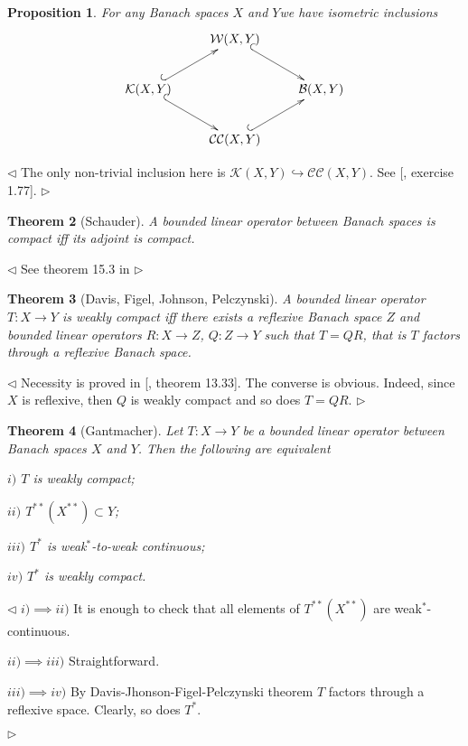 \documentclass[12pt]{article}
\newtheorem{theorem}{Theorem}
\newtheorem{proposition}[theorem]{Proposition}
\newenvironment{proof}{\par $\triangleleft$}{$\triangleright$}
\begin{document}
\begin{proposition} For any Banach spaces $X$ and $Y$we have isometric inclusions
$$
\xymatrix{
                                                   & \mathcal{W}(X,Y) \ar@{^{(}->}[dr]  &                   \\
\mathcal{K}(X,Y) \ar@{^{(}->}[ur] \ar@{^{(}->}[dr] &                                    &  \mathcal{B}(X,Y) \\
                                                   & \mathcal{CC}(X,Y) \ar@{^{(}->}[ur] &                   \\
}
$$
\end{proposition}
\begin{proof} The only non-trivial inclusion here is $\mathcal{K}(X,Y)\hookrightarrow \mathcal{CC}(X,Y)$. See [\cite{FabHabBanSpTh}, exercise 1.77].
\end{proof}

\begin{theorem}[Schauder] A bounded linear operator between Banach spaces is compact iff its adjoint is compact.
\end{theorem}
\begin{proof} See theorem 15.3 in \cite{FabHabBanSpTh}
\end{proof}

\begin{theorem}[Davis, Figel, Johnson, Pelczynski] A bounded linear operator $T:X\to Y$ is weakly compact iff there exists a reflexive Banach space $Z$ and bounded linear operators $R:X\to Z$, $Q:Z\to Y$ such that $T=QR$, that is $T$ factors through a reflexive Banach space.
\end{theorem}
\begin{proof} Necessity is proved in [\cite{FabHabBanSpTh}, theorem 13.33]. The converse is obvious. Indeed, since $X$ is reflexive, then $Q$ is weakly compact and so does $T=QR$.
\end{proof}

\begin{theorem}[Gantmacher] Let $T:X\to Y$ be a bounded linear operator between Banach spaces $X$ and $Y$. Then the following are equivalent

$i)$ $T$ is weakly compact;

$ii)$ $T^{**}(X^{**})\subset Y$;

$iii)$ $T^*$ is weak${}^*$-to-weak continuous;

$iv)$ $T^*$ is weakly compact.
\end{theorem}
\begin{proof} $i)\implies ii)$ It is enough to check that all elements of $T^{**}(X^{**})$ are weak${}^*$-continuous.

$ii)\implies iii)$ Straightforward.

$iii)\implies iv)$ By Davis-Jhonson-Figel-Pelczynski theorem $T$ factors through a reflexive space. Clearly, so does $T^*$.


\end{proof}
\end{document}
